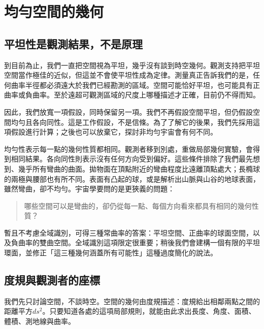 \chapter{均勻空間的幾何}


\section{平坦性是觀測結果，不是原理}

到目前為止，我們一直把空間視為平坦，幾乎沒有談到時空幾何。觀測支持把平坦空間當作極佳的近似，但這並不會使平坦性成為定律。測量真正告訴我們的是，任何曲率半徑都必須遠大於我們已經勘測的區域。空間可能恰好平坦，也可能具有正曲率或負曲率。至於遠超可觀測區域的尺度上哪種描述才正確，目前仍不得而知。

因此，我們放寬一項假設，同時保留另一項。我們不再假設空間平坦，但仍假設空間均勻且各向同性。這是工作假設，不是信條。為了了解它的後果，我們先採用這項假設進行計算；之後也可以放棄它，探討非均勻宇宙會有何不同。

均勻性表示每一點的幾何性質都相同。觀測者移到別處，重做局部幾何實驗，會得到相同結果。各向同性則表示沒有任何方向受到偏好。這些條件排除了我們最先想到、幾乎所有彎曲的曲面。拋物面在頂點附近的彎曲程度比遠離頂點處大；長橢球的兩極與腰部也有所不同。表面有凸起的球，或是解析出山脈與山谷的地球表面，雖然彎曲，卻不均勻。宇宙學要問的是更狹義的問題：
\begin{quote}
哪些空間可以是彎曲的，卻仍從每一點、每個方向看來都具有相同的幾何性質？
\end{quote}

暫且不考慮全域識別，可得三種常曲率的答案：平坦空間、正曲率的球面空間，以及負曲率的雙曲空間。全域識別這項限定很重要；稍後我們會建構一個有限的平坦環面，並修正「這三種幾何涵蓋所有可能性」這種過度簡化的說法。

\section{度規與觀測者的座標}

我們先只討論空間，不談時空。空間的幾何由度規描述：度規給出相鄰兩點之間的距離平方\(ds^2\)。只要知道各處的這項局部規則，就能由此求出長度、角度、面積、體積、測地線與曲率。

